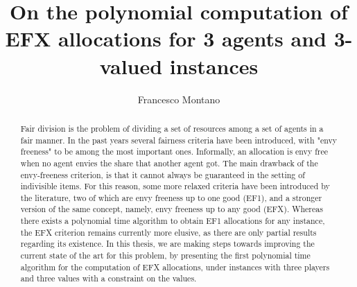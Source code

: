 \documentclass[LaM,binding=0.6cm]{sapthesis}
\title{On the polynomial computation of EFX allocations for 3 agents and 3-valued instances}
\author{Francesco Montano}
\begin{document}
\frontmatter

\maketitle


\begin{abstract}
Fair division is the problem of dividing a set of resources among a set of agents in a fair manner. In the past years several fairness criteria have been introduced, with "envy freeness" to be among the most important ones.
Informally, an allocation is envy free when no agent envies the share that another agent got.
The main drawback of the envy-freeness criterion, is that it cannot always be guaranteed in the setting of indivisible items. For this reason, some more relaxed criteria have been introduced by the literature, two of which are envy freeness up to one good (EF1), and a stronger version of the same concept, namely, envy freeness up to any good (EFX).  Whereas there exists a polynomial time algorithm to obtain EF1 allocations for any instance, the EFX criterion remains currently more elusive, as there are only partial
results regarding its existence.
In this thesis, we are making steps towards improving the current state of the art for this problem, by presenting the first polynomial time algorithm for the computation of EFX allocations, under instances with three players and three values with a constraint on the values. 
\end{abstract}




\tableofcontents



\mainmatter









\backmatter




\printbibliography
\end{document}
